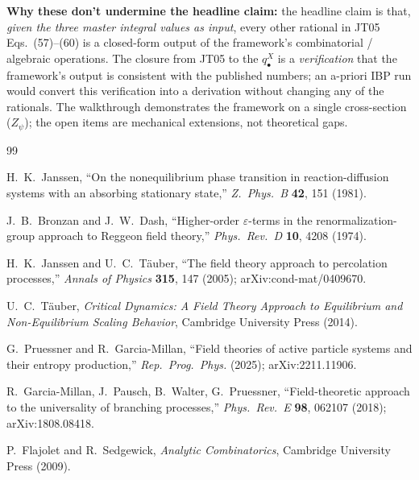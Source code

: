 \documentclass[11pt,a4paper]{article}
\theoremstyle{definition}
\theoremstyle{plain}
\begin{document}
\begin{cfacbox}
\textbf{Why these don't undermine the headline claim:}  the headline
claim is that, \emph{given the three master integral values as
input}, every other rational in JT05 Eqs.~(57)--(60) is a closed-form
output of the framework's combinatorial / algebraic operations.
The closure from JT05 to the $q^X_\bullet$ is a \emph{verification}
that the framework's output is consistent with the published numbers;
an a-priori IBP run would convert this verification into a derivation
without changing any of the rationals.  The walkthrough demonstrates
the framework on a single cross-section ($Z_\psi$); the open items
are mechanical extensions, not theoretical gaps.
\end{cfacbox}

\begin{thebibliography}{99}

  H.~K.~Janssen,
  ``On the nonequilibrium phase transition in reaction-diffusion
  systems with an absorbing stationary state,''
  \textit{Z.\ Phys.\ B} \textbf{42}, 151 (1981).

  J.~B.~Bronzan and J.~W.~Dash,
  ``Higher-order $\varepsilon$-terms in the renormalization-group
  approach to Reggeon field theory,''
  \textit{Phys.\ Rev.\ D} \textbf{10}, 4208 (1974).

  H.~K.~Janssen and U.~C.~T\"auber,
  ``The field theory approach to percolation processes,''
  \textit{Annals of Physics} \textbf{315}, 147 (2005);
  arXiv:cond-mat/0409670.

  U.~C.~T\"auber,
  \textit{Critical Dynamics: A Field Theory Approach to
  Equilibrium and Non-Equilibrium Scaling Behavior},
  Cambridge University Press (2014).

  G.~Pruessner and R.~Garcia-Millan,
  ``Field theories of active particle systems and their entropy
  production,''
  \textit{Rep.\ Prog.\ Phys.} (2025); arXiv:2211.11906.

  R.~Garcia-Millan, J.~Pausch, B.~Walter, G.~Pruessner,
  ``Field-theoretic approach to the universality of branching
  processes,''
  \textit{Phys.\ Rev.\ E} \textbf{98}, 062107 (2018);
  arXiv:1808.08418.

  P.~Flajolet and R.~Sedgewick,
  \textit{Analytic Combinatorics},
  Cambridge University Press (2009).


\end{thebibliography}
\end{document}
